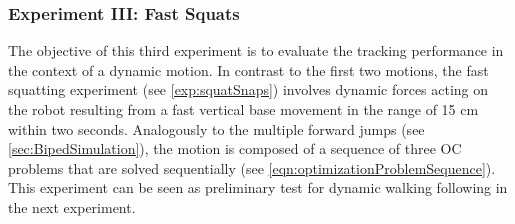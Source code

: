 \subsubsection{Experiment III: Fast Squats}
The objective of this third experiment is to evaluate the tracking performance in the context of a dynamic motion. In contrast to the first two motions, the fast squatting experiment (see \cref{exp:squatSnaps}) involves dynamic forces acting on the robot resulting from a fast vertical base movement in the range of 15 cm within two seconds. Analogously to the multiple forward jumps (see \cref{sec:BipedSimulation}), the motion is composed of a sequence of three \gls{OC} problems that are solved sequentially (see \cref{eqn:optimizationProblemSequence}). This experiment can be seen as preliminary test for dynamic walking following in the next experiment.   

